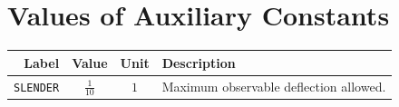 \documentclass[12pt]{article}
\begin{document}

\section{Values of Auxiliary Constants}

\begin{table}[H]
    \caption{Auxiliar Constants}
    \label{TblAuxConstants}
    \renewcommand{\arraystretch}{1.2}
    \begin{longtable}{r c c p{5cm}}
        \toprule
        \textbf{Label}   & \textbf{Value} & \textbf{Unit} & \textbf{Description}                   \\
        \midrule
        \texttt{SLENDER} & $\frac{1}{10}$ & $1$           & Maximum observable deflection allowed. \\
        \bottomrule
    \end{longtable}
\end{table}

\newpage


\printbibliography[heading=bibintoc]
\end{document}
